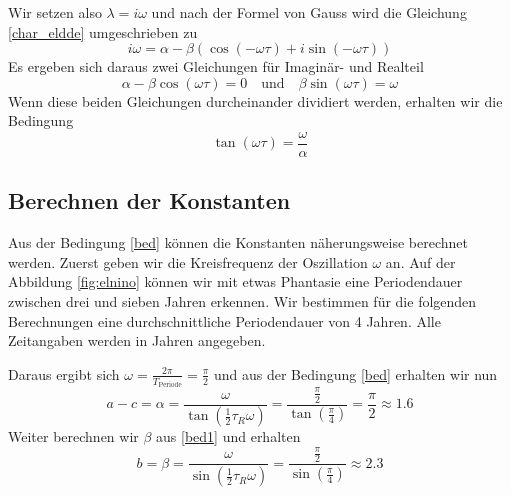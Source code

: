 Wir setzen also $\lambda = i\omega$ und nach der Formel von Gauss wird die Gleichung \eqref{char_eldde} umgeschrieben zu 
\begin{equation}
	 i\omega = \alpha-\beta(\cos(-\omega \tau)+i\sin(-\omega \tau))
\end{equation}
Es ergeben sich daraus zwei Gleichungen für Imaginär- und Realteil
\begin{equation} \label{bed1}
  	\alpha-\beta\cos(\omega \tau) = 0 \quad\text{und}\quad \beta\sin(\omega\tau)=\omega
\end{equation}
Wenn diese beiden Gleichungen durcheinander dividiert werden, erhalten wir die Bedingung
\begin{equation} \label{bed}
	\tan(\omega\tau)=\frac{\omega}{\alpha}
\end{equation}
 
\subsection{Berechnen der Konstanten}
Aus der Bedingung \eqref{bed} können die Konstanten näherungsweise berechnet werden.
Zuerst geben wir die Kreisfrequenz der Oszillation $\omega$ an. 
Auf der Abbildung \ref{fig:elnino} können wir mit etwas Phantasie eine Periodendauer zwischen drei und sieben Jahren erkennen.
Wir bestimmen für die folgenden Berechnungen eine durchschnittliche Periodendauer von 4 Jahren. 
Alle Zeitangaben werden in Jahren angegeben.

Daraus ergibt sich $\omega = \frac{2\pi}{T_\text{Periode}} = \frac{\pi}{2}$ und aus der Bedingung \eqref{bed} erhalten wir nun 
\begin{equation}
	a-c=\alpha=\frac{\omega}{\tan(\frac{1}{2}\tau_R \omega)}=\frac{\frac{\pi}{2}}{\tan(\frac{\pi}{4})}=\frac{\pi}{2}\approx 1.6
\end{equation}
Weiter berechnen wir $\beta$ aus \eqref{bed1} und erhalten
\begin{equation}
	b=\beta=\frac{\omega}{\sin(\frac{1}{2}\tau_R \omega)}=\frac{\frac{\pi}{2}}{\sin(\frac{\pi}{4})}\approx 2.3
\end{equation}


